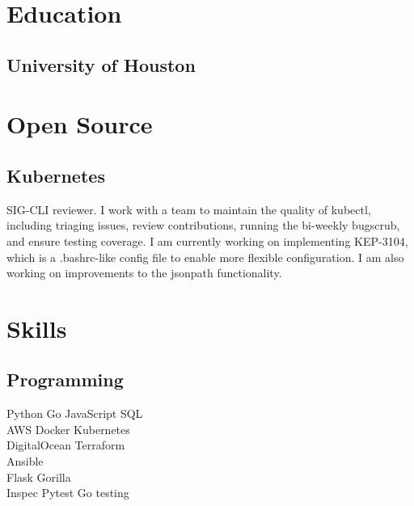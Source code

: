 \documentclass[letterpaper]{deedy-resume-openfont} %
\begin{document}
\begin{minipage}[t]{0.28\textwidth} %


\section{Education}
\subsection{University of Houston}




\section{Open Source}
\subsection{Kubernetes}
SIG-CLI reviewer.  I work with a team to maintain the quality of kubectl, including triaging issues, review contributions, running the bi-weekly bugscrub, and ensure testing coverage. I am currently working on implementing KEP-3104, which is a .bashrc-like config file to enable more flexible configuration. I am also working on improvements to the jsonpath functionality. \\


\section{Skills}

\subsection{Programming}

 Python \textbullet{} Go \textbullet{} JavaScript \textbullet{} SQL \\[7pt]
 AWS \textbullet{} Docker \textbullet{} Kubernetes \\
 DigitalOcean \textbullet{} Terraform \\
 Ansible \\[7pt]
 Flask \textbullet{} Gorilla \\[7pt]
 Inspec \textbullet{} Pytest \textbullet{} Go testing \\[7pt]


\end{minipage}
\end{document}
